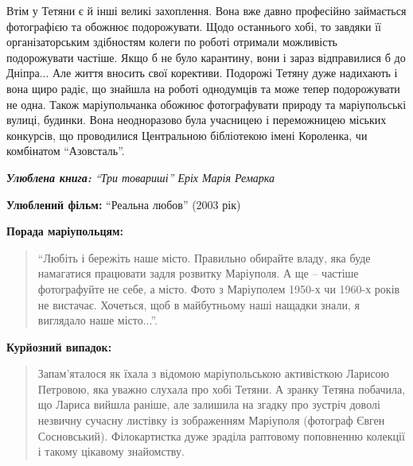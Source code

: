 
Втім у Тетяни є й інші великі захоплення. Вона вже давно професійно  займається
фотографією та обожнює подорожувати. Щодо останнього хобі, то завдяки її
організаторським здібностям колеги по роботі отримали можливість подорожувати
частіше. Якщо б не було карантину, вони і зараз відправилися б до Дніпра... Але
життя вносить свої корективи. Подорожі Тетяну дуже надихають і вона щиро радіє,
що знайшла на роботі однодумців та може тепер подорожувати не одна. Також
маріупольчанка обожнює фотографувати природу та маріупольські вулиці, будинки.
Вона неодноразово була учасницею і переможницею міських конкурсів, що
проводилися Центральною бібліотекою імені Короленка, чи комбінатом \enquote{Азовсталь}.


\begingroup
\em
\textbf{Улюблена книга:} \enquote{Три товариші} Еріх Марія Ремарка

\textbf{Улюблений фільм:} \enquote{Реальна любов} (2003 рік)

\textbf{Порада маріупольцям:} 

\begin{quote}
\enquote{Любіть і бережіть наше місто. Правильно обирайте владу, яка буде намагатися
працювати задля розвитку Маріуполя. А ще – частіше фотографуйте не себе, а
місто. Фото з Маріуполем 1950-х чи 1960-х років не вистачає. Хочеться, щоб в
майбутньому наші нащадки знали, я виглядало наше місто...}.
\end{quote}

\textbf{Курйозний випадок:} 

\begin{quote}
Запам'яталося як їхала з відомою маріупольською активісткою Ларисою Петровою,
яка уважно слухала про хобі Тетяни. А зранку Тетяна побачила, що Лариса вийшла
раніше, але залишила на згадку про зустріч доволі незвичну сучасну листівку із
зображенням Маріуполя (фотограф Євген Сосновський). Філокартистка дуже зраділа
раптовому поповненню колекції і такому цікавому знайомству.
\end{quote}
\endgroup
